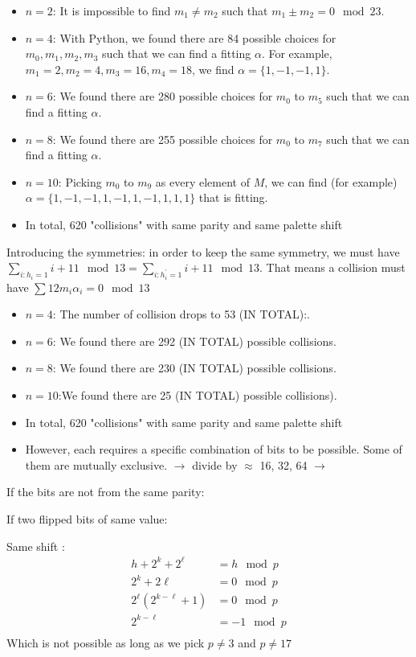 \documentclass{article}
\begin{document}
\begin{itemize}
	\item $n=2$: It is impossible to find $m_1 \neq m_2$ such that $m_1 \pm m_2 = 0 \mod 23$.
	\item $n=4$: With Python, we found there are 84 possible choices for $m_0, m_1, m_2, m_3$ such that we can find a fitting $\alpha$. For example, $m_1 = 2, m_2 = 4, m_3 = 16, m_4 = 18$, we find $\alpha = \{1, -1, -1,1\}$.
	\item $n=6$: We found there are 280 possible choices for $m_0$ to $m_5$ such that we can find a fitting $\alpha$.
	\item $n=8$: We found there are 255 possible choices for $m_0$ to $m_7$ such that we can find a fitting $\alpha$.
	\item $n=10$: Picking $m_0$ to $m_9$ as every element of $M$, we can find (for example) $\alpha = \{1, -1, -1, 1,-1,1,-1,1,1,1\}$ that is fitting.
	\item In total, 620 "collisions" with same parity and same palette shift
\end{itemize}
Introducing the symmetries: in order to keep the same symmetry, we must have $\sum\limits_{i : h_i =1}i + 11 \mod 13 = \sum\limits_{i : h^\prime_i =1}i + 11 \mod 13$. That means a collision must have $\sum 12m_i\alpha_i = 0\mod 13$
\begin{itemize}
	\item $n=4$: The number of collision drops to 53 (IN TOTAL):.
	\item $n=6$: We found there are 292 (IN TOTAL) possible collisions.
	\item $n=8$: We found there are 230 (IN TOTAL) possible collisions.
	\item $n=10$:We found there are 25 (IN TOTAL) possible collisions).
	\item In total, 620 "collisions" with same parity and same palette shift
	\item However, each requires a specific combination of bits to be possible. Some of them are mutually exclusive. $\rightarrow$ divide by $\approx$ 16, 32, 64 $\rightarrow$  
\end{itemize}

If the bits are not from the same parity:

If two flipped bits of same value:

Same shift : 
\begin{align*}
	h + 2^k + 2^\ell &= h \mod p \\
	2^k + 2\ell &= 0 \mod p\\
	2^\ell( 2^{k-\ell} + 1) &= 0 \mod p\\
 	2^{k-\ell} &= -1 \mod p\\
\end{align*}
Which is not possible as long as we pick $p \neq 3$ and $p \neq 17$
\end{document}
